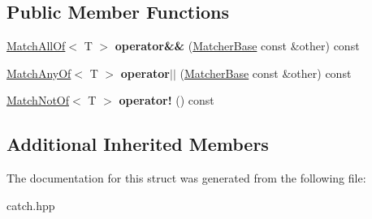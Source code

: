 \subsection*{Public Member Functions}
\begin{DoxyCompactItemize}
\item 
\hyperlink{structCatch_1_1Matchers_1_1Impl_1_1MatchAllOf}{Match\+All\+Of}$<$ T $>$ {\bfseries operator\&\&} (\hyperlink{structCatch_1_1Matchers_1_1Impl_1_1MatcherBase}{Matcher\+Base} const \&other) const \hypertarget{structCatch_1_1Matchers_1_1Impl_1_1MatcherBase_a275a18e3e1c4d0bddfde34e362f66b6c}{}\label{structCatch_1_1Matchers_1_1Impl_1_1MatcherBase_a275a18e3e1c4d0bddfde34e362f66b6c}

\item 
\hyperlink{structCatch_1_1Matchers_1_1Impl_1_1MatchAnyOf}{Match\+Any\+Of}$<$ T $>$ {\bfseries operator$\vert$$\vert$} (\hyperlink{structCatch_1_1Matchers_1_1Impl_1_1MatcherBase}{Matcher\+Base} const \&other) const \hypertarget{structCatch_1_1Matchers_1_1Impl_1_1MatcherBase_a382ffd0d07d6a5cdadd2bd36ade0a742}{}\label{structCatch_1_1Matchers_1_1Impl_1_1MatcherBase_a382ffd0d07d6a5cdadd2bd36ade0a742}

\item 
\hyperlink{structCatch_1_1Matchers_1_1Impl_1_1MatchNotOf}{Match\+Not\+Of}$<$ T $>$ {\bfseries operator!} () const \hypertarget{structCatch_1_1Matchers_1_1Impl_1_1MatcherBase_afd5c25339eab93d9ea037fa4282fca7c}{}\label{structCatch_1_1Matchers_1_1Impl_1_1MatcherBase_afd5c25339eab93d9ea037fa4282fca7c}

\end{DoxyCompactItemize}
\subsection*{Additional Inherited Members}


The documentation for this struct was generated from the following file\+:\begin{DoxyCompactItemize}
\item 
catch.\+hpp\end{DoxyCompactItemize}
